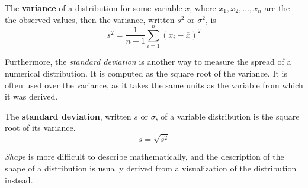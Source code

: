 \documentclass[10pt]{article}
\newenvironment{definition}[1][]{\begin{tcolorbox}[colframe=_orange,colback=_orange2,title=Definition. \ifthenelse{\isempty{#1}}{}{(#1)}
]}{\end{tcolorbox}}
\begin{document}
\begin{definition}[Variance]
    The \textbf{variance} of a distribution for some variable $x$, where $x_1,x_2,\dots,x_n$ are the the observed values, then the variance, written $s^2$ or $\sigma^2$, is
    $$
        s^2=\frac{1}{n-1}\sum_{i=1}^n(x_i-\overline x)^2
    $$
\end{definition}
Furthermore, the \textit{standard deviation} is another way to measure the spread of a numerical distribution. It is computed as the square root of the variance. It is often used over the variance, as it takes the same units as the variable from which it was derived.
\begin{definition}
    The \textbf{standard deviation}, written $s$ or $\sigma$, of a variable distribution is the square root of its variance.
    $$
        s=\sqrt{s^2}
    $$
\end{definition}
\textit{Shape} is more difficult to describe mathematically, and the description of the shape of a distribution is usually derived from a visualization of the distribution instead.
\end{document}
